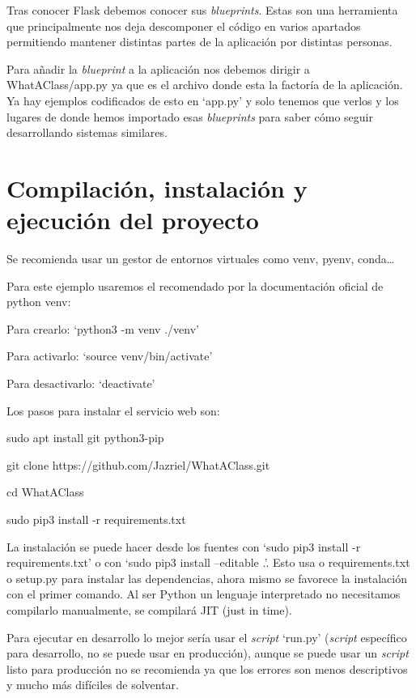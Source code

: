 Tras conocer Flask debemos conocer sus \emph{blueprints}. Estas son una herramienta que principalmente nos deja descomponer el código en varios apartados permitiendo mantener distintas partes de la aplicación por distintas personas.

Para añadir la \emph{blueprint} a la aplicación nos debemos dirigir a WhatAClass/app.py ya que es el archivo donde esta la factoría de la aplicación. Ya hay ejemplos codificados de esto en `app.py' y solo tenemos que verlos y los lugares de donde hemos importado esas \emph{blueprints} para saber cómo seguir desarrollando sistemas similares.


 

\section{Compilación, instalación y ejecución del proyecto}

Se recomienda usar un gestor de entornos virtuales como venv, pyenv, conda\ldots

Para este ejemplo usaremos el recomendado por la documentación oficial de python venv: 
	
Para crearlo: `python3 -m venv ./venv'
	
Para activarlo: `source venv/bin/activate'

Para desactivarlo: `deactivate'

Los pasos para instalar el servicio web son:
\begin{list}{-}{}
\item sudo apt install git python3-pip
\item git clone https://github.com/Jazriel/WhatAClass.git
\item cd WhatAClass
\item sudo pip3 install -r requirements.txt
\end{list}

La instalación se puede hacer desde los fuentes con `sudo pip3 install -r requirements.txt' o con `sudo pip3 install --editable .'. Esto usa o requirements.txt o setup.py para instalar las dependencias, ahora mismo se favorece la instalación con el primer comando. Al ser Python un lenguaje interpretado no necesitamos compilarlo manualmente, se compilará JIT (just in time).

Para ejecutar en desarrollo lo mejor sería usar el \emph{script} `run.py' (\emph{script} específico para desarrollo, no se puede usar en producción), aunque se puede usar un \emph{script} listo para producción no se recomienda ya que los errores son menos descriptivos y mucho más difíciles de solventar.

